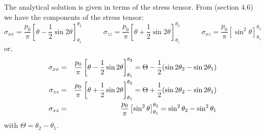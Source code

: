 The analytical solution is given in terms of the stress tensor.
From \textcite{dase96}(section 4.6) we have the components of the stress tensor:
\[
\sigma_{xx}=\frac{p_0}{\pi}\left[ \theta - \frac{1}{2}\sin 2\theta  \right]^{\theta_2}_{\theta_1}
\quad\quad\quad
\sigma_{zz}=\frac{p_0}{\pi}\left[ \theta + \frac{1}{2}\sin 2\theta  \right]^{\theta_2}_{\theta_1}
\quad\quad\quad
\sigma_{xz}=\frac{p_0}{\pi}\left[ \sin^2 \theta  \right]^{\theta_2}_{\theta_1}
\]
or, 
\begin{eqnarray}
{\sigma}_{xx}&=&\frac{p_0}{\pi}\left[ \theta - \frac{1}{2}\sin 2\theta  \right]^{\theta_2}_{\theta_1} = \Theta - \frac{1}{2} ( \sin 2\theta_2 - \sin 2\theta_1) \nonumber\\
{\sigma}_{zz}&=&\frac{p_0}{\pi}\left[ \theta + \frac{1}{2}\sin 2\theta  \right]^{\theta_2}_{\theta_1} = \Theta + \frac{1}{2} ( \sin 2\theta_2 - \sin 2\theta_1) \nonumber\\
{\sigma}_{xz}&=&\frac{p_0}{\pi}\left[ \sin^2 \theta  \right]^{\theta_2}_{\theta_1} =  \sin^2 \theta_2 - \sin^2 \theta_1 \nonumber
\end{eqnarray}
with $\Theta=\theta_2-\theta_1$. 

